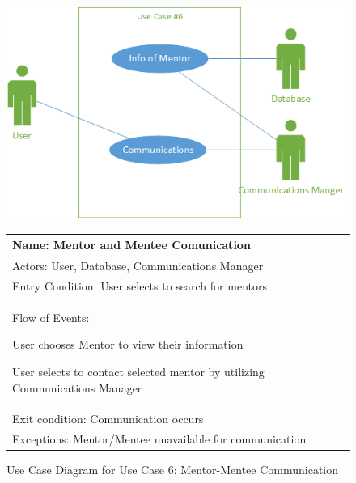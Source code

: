 \documentclass[11pt]{article}
\begin{document}
            \begin{figure}[H]
            \centering
            \includegraphics{UseCase6MentoMenteeConnection}

				\begin{tabular}{|p{12 cm}|}
					\hline
					Name: Mentor and Mentee Comunication \\ \hline
					Actors: User, Database, Communications Manager \\ \hline
					Entry Condition: User selects to search for mentors
					\\ \hline
					Flow of Events:
					\begin{enumerate*}
						\item User chooses Mentor to view their information
						\item User selects to contact selected mentor by
						utilizing Communications Manager
					\end{enumerate*} \\ \hline
					Exit condition: Communication occurs
					\\ \hline
					Exceptions: Mentor/Mentee unavailable for communication
					\\ \hline
				\end{tabular}

            \caption{Use Case Diagram for Use Case 6: Mentor-Mentee
			Communication}
            \label{UC6}
            \end{figure}
\end{document}
